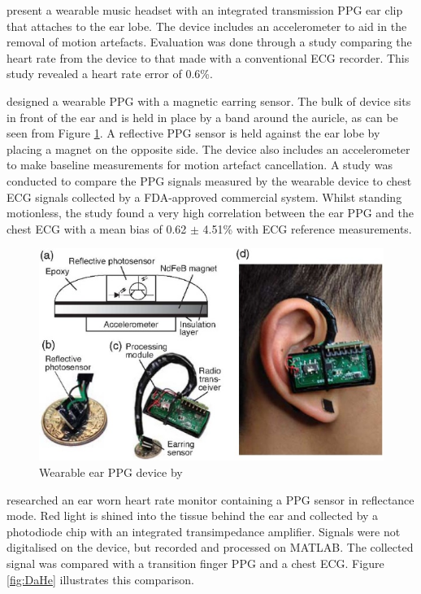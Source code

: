 \medskip
\cite{shin2009novel} present a wearable music headset with an integrated transmission PPG ear clip that attaches to the ear lobe. The device includes an accelerometer to aid in the removal of motion artefacts. Evaluation was done through a study comparing the heart rate from the device to that made with a conventional ECG recorder. This study revealed a heart rate error of 0.6\%.

\medskip
\cite{poh2010motion} designed a wearable PPG with a magnetic earring sensor. The bulk of device sits in front of the ear and is held in place by a band around the auricle, as can be seen from Figure \ref{fig:poh}. A reflective PPG sensor is held against the ear lobe by placing a magnet on the opposite side. The device also includes an accelerometer to make baseline measurements for motion artefact cancellation. A study was conducted to compare the PPG signals measured by the wearable device to chest ECG signals collected by a FDA-approved commercial system. Whilst standing motionless, the study found a very high correlation between the ear PPG and the chest ECG with a mean bias of 0.62 $\pm$ 4.51\% with ECG reference measurements.

\medskip

\begin{figure}[h]
   \centering
   \includegraphics[scale=1.2]{figs/poh}
   \caption{Wearable ear PPG device by \cite{poh2010motion}}
   \label{fig:poh}
\end{figure}

\cite{da2010ear} researched an ear worn heart rate monitor containing a PPG sensor in reflectance mode. Red light is shined into the tissue behind the ear and collected by a photodiode chip with an integrated transimpedance amplifier. Signals were not digitalised on the device, but recorded and processed on MATLAB. The collected signal was compared with a transition finger PPG and a chest ECG. Figure \ref{fig:DaHe} illustrates this comparison.

